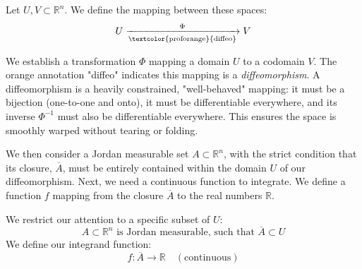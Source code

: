 \begin{math_stroke}
Let $U, V \subset \mathbb{R}^n$. We define the mapping between these spaces:
\[
U \xrightarrow[\text{\textcolor{proforange}{diffeo}}]{\Phi} V
\]

\begin{explanation-of-steps}
We establish a transformation $\Phi$ mapping a domain $U$ to a codomain $V$. The orange annotation "diffeo" indicates this mapping is a \textit{diffeomorphism}. A diffeomorphism is a heavily constrained, "well-behaved" mapping: it must be a bijection (one-to-one and onto), it must be differentiable everywhere, and its inverse $\Phi^{-1}$ must also be differentiable everywhere. This ensures the space is smoothly warped without tearing or folding.
\end{explanation-of-steps}

\begin{center}
\end{center}
\end{math_stroke}

\begin{spoken_clean}[00:01:29 - 00:02:45]
We then consider a Jordan measurable set $A \subset \mathbb{R}^n$, with the strict condition that its closure, $\overline{A}$, must be entirely contained within the domain $U$ of our diffeomorphism. Next, we need a continuous function to integrate. We define a function $f$ mapping from the closure $\overline{A}$ to the real numbers $\mathbb{R}$.
\end{spoken_clean}

\begin{math_stroke}
We restrict our attention to a specific subset of $U$:
\[
A \subset \mathbb{R}^n \text{ is Jordan measurable, such that } \overline{A} \subset U
\]
We define our integrand function:
\[
f: \overline{A} \to \mathbb{R} \quad (\text{continuous})
\]


\end{math_stroke}

